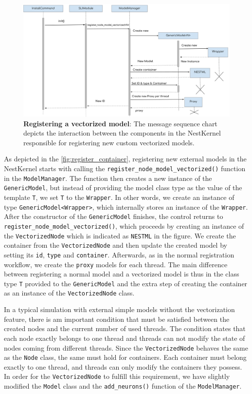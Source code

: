 \begin{figure}[h!]
\centering
\includegraphics[width=\textwidth]{src/pic/node_creation_vec.png}
\caption{\textbf{Registering a vectorized model}: The message sequence chart depicts the interaction between the components in the NestKernel responsible for registering new custom vectorized models.}
\label{fig:register_container}
\end{figure}

As depicted in the \autoref{fig:register_container}, registering new external models in the NestKernel starts with calling the \texttt{register\_node\_model\_vectorized()} function in the \texttt{ModelManager}. The function then creates a new instance of the \texttt{GenericModel}, but instead of providing the model class type as the value of the template \texttt{T}, we set \texttt{T} to the \texttt{Wrapper}. In other words, we create an instance of type \texttt{GenericModel<Wrapper>}, which internally stores an instance of the \texttt{Wrapper}. After the constructor of the \texttt{GenericModel} finishes, the control returns to \texttt{register\_node\_model\_vectorized()}, which proceeds by creating an instance of the \texttt{VectorizedNode} which is indicated as \texttt{NESTML} in the figure. We create the container from the \texttt{VectorizedNode} and then update the created model by setting its \texttt{id}, \texttt{type} and \texttt{container}. Afterwards, as in the normal registration workflow, we create the \texttt{proxy} models for each thread. The main difference between registering a normal model and a vectorized model is thus in the class type \texttt{T} provided to the \texttt{GenericModel} and the extra step of creating the container as an instance of the \texttt{VectorizedNode} class.

In a typical simulation with external simple models without the vectorization feature, there is am important condition that must be satisfied between the created nodes and the current number of used threads. The condition states that each node exactly belongs to one thread and threads can not modify the state of nodes coming from different threads. Since the \texttt{VectorizedNode} behaves the same as the \texttt{Node} class, the same must hold for containers. Each container must belong exactly to one thread, and threads can only modify the containers they possess. In order for the \texttt{VectorizedNode} to fulfill this requirement, we have slightly modified the \texttt{Model} class and the  \texttt{add\_neurons()} function of the \texttt{ModelManager}.\\

